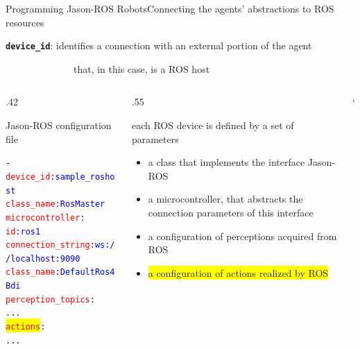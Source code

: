 \documentclass[compress]{beamer}
\newcommand{\yamlkey}[1]{\textcolor{red}{\texttt{#1}}}
\newcommand{\yamlvalue}[1]{\textcolor{blue}{\texttt{#1}}}
\begin{document}
\begin{frame}[fragile]{Programming Jason-ROS Robots}{Connecting the agents' abstractions to ROS resources}

    \footnotesize
    \texttt{{\bf device\_id}}: identifies a connection with an external portion of the agent\\ 
    
    \vspace{-.5cm}
    
    \ \ \ \ \ \ \ \ \ \ \ \ \ \ {\tiny that, in this case, is a ROS host}

    
    \begin{columns}
       \begin{column}{.42\textwidth}      
            \begin{block}{{\scriptsize Jason-ROS configuration file}}
                \scriptsize
                \begin{alltt} \tiny
- \yamlkey{device\_id}: \yamlvalue{sample\_roshost}
  \yamlkey{class_name}: \yamlvalue{RosMaster}
  \yamlkey{microcontroller}: 
    \yamlkey{id}: \yamlvalue{ros1} 
    \yamlkey{connection_string}: \yamlvalue{ws://localhost:9090} 
    \yamlkey{class_name}: \yamlvalue{DefaultRos4Bdi}
  \yamlkey{perception_topics}:         
    ...
  \colorbox{yellow}{\yamlkey{actions}}:       
    ...
                \end{alltt}

            \end{block}    
        \end{column}
        
        \hspace{-25pt} %
  
        \begin{column}{.55\textwidth} \scriptsize
  
            each ROS device is defined by a set of parameters
            \begin{itemize}\tiny
                \item a class that implements the interface Jason-ROS
                \item a microcontroller, that abstracts the connection parameters of this interface
                \item a configuration of perceptions acquired from ROS
                \item \colorbox{yellow}{a configuration of actions realized by ROS}
            \end{itemize}
        \end{column}`      
    \end{columns}
  

\end{frame}
\end{document}
